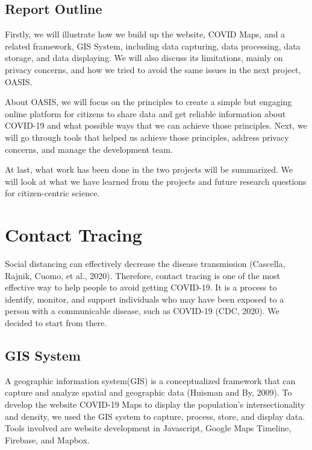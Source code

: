 \documentclass{ucsdreport}
\begin{document}
\subsection{Report Outline}
Firstly, we will illustrate how we build up the website, COVID Maps, and a
related framework, GIS System, including data capturing, data processing, 
data storage, and data displaying. We will also discuss its limitations, 
mainly on privacy concerns, and how we tried to avoid the same issues in the
next project, OASIS. 

About OASIS, we will focus on the principles to create a simple but engaging 
online platform for citizens to share data and get reliable information about 
COVID-19 and what possible ways that we can achieve those principles. Next, we
will go through tools that helped us achieve those principles, address privacy
concerns, and manage the development team. 

At last, what work has been done in the two projects will be summarized. We will 
look at what we have learned from the projects and future research questions 
for citizen-centric science. 

\newpage



\section{Contact Tracing}
Social distancing can effectively decrease the disease transmission (Cascella, 
Rajnik, Cuomo, et al., 2020). Therefore, contact tracing is one of the most 
effective way to help people to avoid getting COVID-19. It is a process to 
identify, monitor, and support individuals who may have been exposed to a
person with a communicable disease, such as COVID-19 (CDC, 2020). We 
decided to start from there.

\subsection{GIS System}
A geographic information system(GIS) is a conceptualized framework that can 
capture and analyze spatial and geographic data (Huisman and By, 2009).
To develop the 
website COVID-19 Maps to display the population's intersectionality and density,
we used the GIS system to capture, process, store, and display data. Tools 
involved are website development in Javascript, Google Maps Timeline, Firebase,
and Mapbox. 
\end{document}
